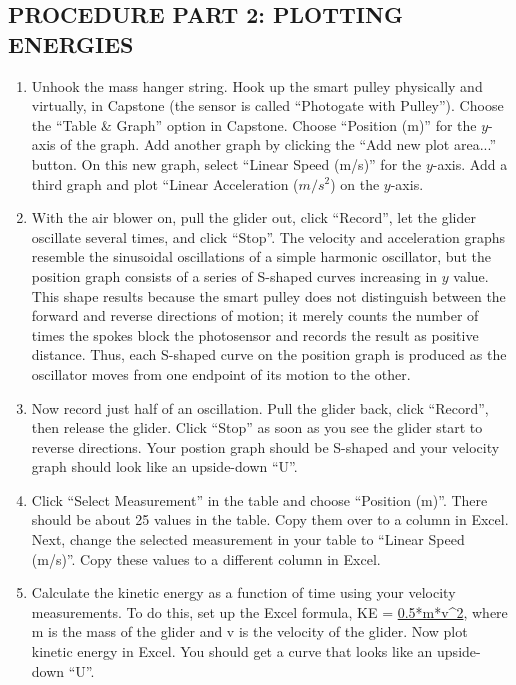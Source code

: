\subsection*{PROCEDURE PART 2: PLOTTING ENERGIES}

\begin{enumerate}[label=\arabic*.]

\item Unhook the mass hanger string. Hook up the smart pulley physically and virtually, in Capstone (the sensor is called ``Photogate with Pulley'').  Choose the ``Table \& Graph'' option in Capstone.  Choose ``Position (m)'' for the \(y\)-axis of the graph.  Add another graph by clicking the ``Add new plot area...'' button.  On this new graph, select ``Linear Speed (m/s)'' for the \(y\)-axis.  Add a third graph and plot ``Linear Acceleration ($m/s^2$) on the \(y\)-axis.

\item With the air blower on, pull the glider out, click ``Record'', let the glider oscillate several times, and click ``Stop''.  The velocity and acceleration graphs resemble the sinusoidal oscillations of a simple harmonic oscillator, but the position graph consists of a series of S-shaped curves increasing in \(y\) value.  This shape results because the smart pulley does not distinguish between the forward and reverse directions of motion; it merely counts the number of times the spokes block the photosensor and records the result as positive distance.  Thus, each S-shaped curve on the position graph is produced as the oscillator moves from one endpoint of its motion to the other.

\item Now record just half of an oscillation.  Pull the glider back, click ``Record'', then release the glider.  Click ``Stop'' as soon as you see the glider start to reverse directions.  Your postion graph should be S-shaped and your velocity graph should look like an upside-down ``U''.

\item Click ``Select Measurement'' in the table and choose ``Position (m)''.  There should be about 25 values in the table.  Copy them over to a column in Excel.  Next, change the selected measurement in your table to ``Linear Speed (m/s)''.  Copy these values to a different column in Excel.

\item Calculate the kinetic energy as a function of time using your velocity measurements.  To do this, set up the Excel formula, KE = \url{0.5*m*v^2}, where m is the mass of the glider and v is the velocity of the glider.  Now plot kinetic energy in Excel.  You should get a curve that looks like an upside-down ``U''.


\end{enumerate}
